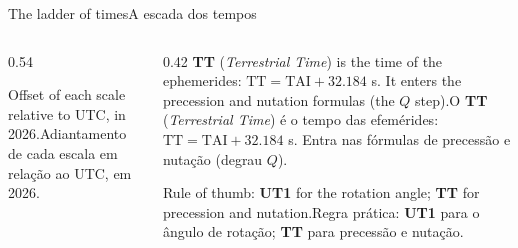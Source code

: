 \documentclass[aspectratio=169,11pt]{beamer}
\newcommand{\tr}[2]{\ifEN#2\else#1\fi}
\newcommand{\bnum}[1]{\textbf{\textcolor{mTeal}{#1}}}
\begin{document}
\begin{frame}{\tr{A escada dos tempos}{The ladder of times}}
  \begin{columns}[T]
    \begin{column}{0.54\textwidth}
      \centering
      \par\smallskip
      {\scriptsize\textcolor{mStoneMid}{\tr{Adiantamento de cada escala em relação ao UTC, em 2026.}{Offset of each scale relative to UTC, in 2026.}}}
    \end{column}
    \begin{column}{0.42\textwidth}
      \small
      \tr{O \bnum{TT} (\emph{Terrestrial Time}) é o tempo das efemérides: $\text{TT} = \text{TAI} + \num{32.184}$ s. Entra nas fórmulas de precessão e nutação (degrau $Q$).}{\bnum{TT} (\emph{Terrestrial Time}) is the time of the ephemerides: $\text{TT} = \text{TAI} + \num{32.184}$ s. It enters the precession and nutation formulas (the $Q$ step).}
      \medskip

      \tr{Regra prática: \bnum{UT1} para o ângulo de rotação; \bnum{TT} para precessão e nutação.}{Rule of thumb: \bnum{UT1} for the rotation angle; \bnum{TT} for precession and nutation.}
    \end{column}
  \end{columns}
\end{frame}
\end{document}
